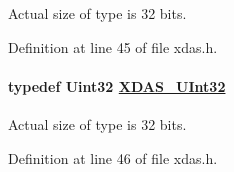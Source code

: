 Actual size of type is 32 bits. 

Definition at line 45 of file xdas.h.\hypertarget{group__ti__xdais___x_d_a_s_g615572fcd2279a6780dc1785d72ff421}{
\paragraph[XDAS\_\-UInt32]{\setlength{\rightskip}{0pt plus 5cm}typedef Uint32 \hyperlink{group__ti__xdais___x_d_a_s_g615572fcd2279a6780dc1785d72ff421}{XDAS\_\-UInt32}}\hfill}
\label{group__ti__xdais___x_d_a_s_g615572fcd2279a6780dc1785d72ff421}


Actual size of type is 32 bits. 

Definition at line 46 of file xdas.h.